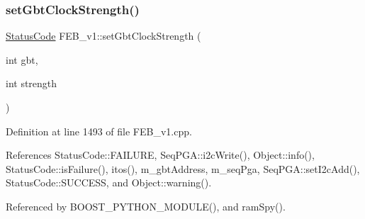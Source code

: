 \mbox{\label{classFEB__v1_a717d56186e6221cb20397cc3e496da50}} 
\subsubsection{\texorpdfstring{set\+Gbt\+Clock\+Strength()}{setGbtClockStrength()}}
{\footnotesize\ttfamily \hyperlink{classStatusCode}{Status\+Code} F\+E\+B\+\_\+v1\+::set\+Gbt\+Clock\+Strength (\begin{DoxyParamCaption}\item[{int}]{gbt,  }\item[{int}]{strength }\end{DoxyParamCaption})}



Definition at line 1493 of file F\+E\+B\+\_\+v1.\+cpp.



References Status\+Code\+::\+F\+A\+I\+L\+U\+RE, Seq\+P\+G\+A\+::i2c\+Write(), Object\+::info(), Status\+Code\+::is\+Failure(), itos(), m\+\_\+gbt\+Address, m\+\_\+seq\+Pga, Seq\+P\+G\+A\+::set\+I2c\+Add(), Status\+Code\+::\+S\+U\+C\+C\+E\+SS, and Object\+::warning().



Referenced by B\+O\+O\+S\+T\+\_\+\+P\+Y\+T\+H\+O\+N\+\_\+\+M\+O\+D\+U\+L\+E(), and ram\+Spy().


